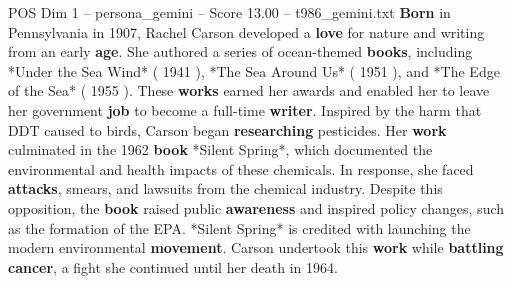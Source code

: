 \begin{textsample}{POS Dim 1 – persona\_gemini – Score 13.00 – t986\_gemini.txt}  \label{ex:f1_pos_047}
\textbf{Born} in Pennsylvania in 1907, Rachel Carson developed a \textbf{love} for nature and writing from an early \textbf{age}.
She authored a series of ocean-themed \textbf{books}, including *Under the Sea Wind* ( 1941 ), *The Sea Around Us* ( 1951 ), and *The Edge of the Sea* ( 1955 ).
These \textbf{works} earned her awards and enabled her to leave her government \textbf{job} to become a full-time \textbf{writer}.
Inspired by the harm that DDT caused to birds, Carson began \textbf{researching} pesticides.
Her \textbf{work} culminated in the 1962 \textbf{book} *Silent Spring*, which documented the environmental and health impacts of these chemicals.
In response, she faced \textbf{attacks}, smears, and lawsuits from the chemical industry.
Despite this opposition, the \textbf{book} raised public \textbf{awareness} and inspired policy changes, such as the formation of the EPA. *Silent Spring* is credited with launching the modern environmental \textbf{movement}.
Carson undertook this \textbf{work} while \textbf{battling} \textbf{cancer}, a fight she continued until her death in 1964.

\end{textsample}
